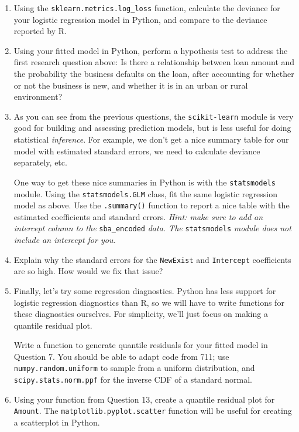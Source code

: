 \documentclass[11pt]{article}
\begin{document}
\begin{enumerate}
\item Using the \verb;sklearn.metrics.log_loss; function, calculate the deviance for your logistic regression model in Python, and compare to the deviance reported by R.

\item Using your fitted model in Python, perform a hypothesis test to address the first research question above: Is there a relationship between loan amount and the probability the business defaults on the
loan, after accounting for whether or not the business is new, and whether it is in an urban
or rural environment?

\item As you can see from the previous questions, the \verb;scikit-learn; module is very good for building and assessing prediction models, but is less useful for doing statistical \textit{inference}. For example, we don't get a nice summary table for our model with estimated standard errors, we need to calculate deviance separately, etc.

One way to get these nice summaries in Python is with the \verb;statsmodels; module. Using the \verb;statsmodels.GLM; class, fit the same logistic regression model as above. Use the \verb;.summary(); function to report a nice table with the estimated coefficients and standard errors. \textit{Hint: make sure to add an intercept column to the} \verb;sba_encoded; \textit{data. The} \verb;statsmodels; \textit{module does not include an intercept for you.}

\item Explain why the standard errors for the \verb;NewExist; and \verb;Intercept; coefficients are so high. How would we fix that issue?

\item Finally, let's try some regression diagnostics. Python has less support for logistic regression diagnostics than R, so we will have to write functions for these diagnostics ourselves. For simplicity, we'll just focus on making a quantile residual plot.

Write a function to generate quantile residuals for your fitted model in Question 7. You should be able to adapt code from 711; use \verb;numpy.random.uniform; to sample from a uniform distribution, and \verb;scipy.stats.norm.ppf; for the inverse CDF of a standard normal.

\item Using your function from Question 13, create a quantile residual plot for \verb;Amount;. The \verb;matplotlib.pyplot.scatter; function will be useful for creating a scatterplot in Python.
\end{enumerate}
\end{document}
